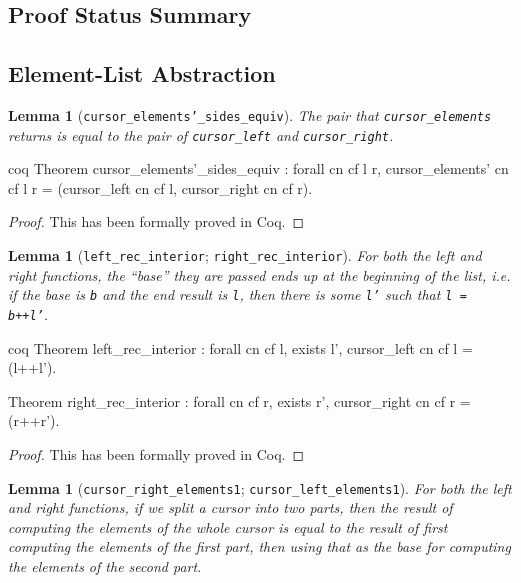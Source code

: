 \documentclass[12pt]{article}
\newtheorem{lemma}[theorem]{Lemma}
\newcommand{\nocontentsline}[3]{}
\newcommand{\tocless}[2]{\bgroup\let\addcontentsline=\nocontentsline#1{#2}\egroup}
\begin{document}
\begin{appendices}

\section{Proof Status Summary}
\label{app:proofs}

\setcounter{theorem}{0}
\begin{singlespace}

\tocless\subsection{Element-List Abstraction}

\begin{lemma}[\texttt{cursor\_elements'\_sides\_equiv}]
The pair that \texttt{cursor\_elements} returns is equal to the pair of \texttt{cursor\_left} and \texttt{cursor\_right}.
\end{lemma}

\begin{cminted}{coq}
Theorem cursor_elements'_sides_equiv : forall cn cf l r,
  cursor_elements' cn cf l r =
  (cursor_left cn cf l, cursor_right cn cf r).
\end{cminted}

\begin{proof}
This has been formally proved in Coq.
\end{proof}

\begin{lemma}[\texttt{left\_rec\_interior}; \texttt{right\_rec\_interior}]
For both the left and right functions, the ``base'' they are passed ends up at the beginning of the list, i.e. if the base is \texttt{b} and the end result is \texttt{l}, then there is some \texttt{l'} such that \texttt{l = b++l'}.
\end{lemma}

\begin{cminted}{coq}
Theorem left_rec_interior : forall cn cf l,
  exists l', cursor_left cn cf l = (l++l').
  
Theorem right_rec_interior : forall cn cf r,
  exists r', cursor_right cn cf r = (r++r').
\end{cminted}

\begin{proof}
This has been formally proved in Coq.
\end{proof}

\begin{lemma}[\texttt{cursor\_right\_elements1}; \texttt{cursor\_left\_elements1}]
For both the left and right functions, if we split a cursor into two parts, then the result of computing the elements of the whole cursor is equal to the result of first computing the elements of the first part, then using that as the base for computing the elements of the second part.
\end{lemma}


\end{singlespace}
\end{appendices}
\end{document}
